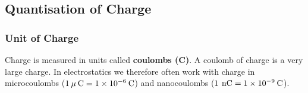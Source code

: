     \addtocounter{footnote}{-0}
    
          \par 
        
      
    
    

\label{m38781*fs-id1165908850940}
            \subsection{ Quantisation of Charge}
            \nopagebreak
            \label{m38781*eip-97}
            \subsubsection{ Unit of Charge}
            \nopagebreak
            

\label{m38781*id200658}Charge is measured in units called \textbf{coulombs (C)}. A coulomb of charge is a very large charge. In electrostatics we therefore often work with charge in microcoulombs (\begin{math}1\phantom{\rule{2pt}{0ex}}\mu \phantom{\rule{2pt}{0ex}}\mathrm{C}=1\ensuremath{\times}{10}^{-6}\phantom{\rule{2pt}{0ex}}\mathrm{C}\end{math}) and nanocoulombs (\begin{math}1\phantom{\rule{2pt}{0ex}}\phantom{\rule{2pt}{0ex}}\mathrm{nC}=1\ensuremath{\times}{10}^{-9}\phantom{\rule{2pt}{0ex}}\mathrm{C}\end{math}).
\par 

\label{m38781*eip-309}\vspace{.5cm} 
      
